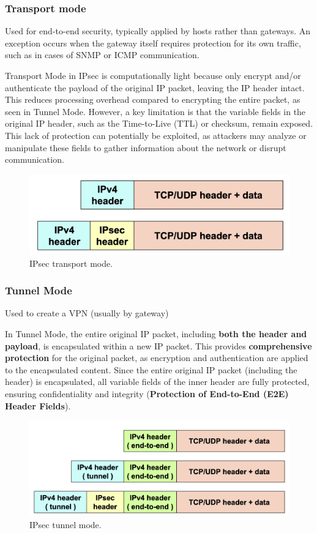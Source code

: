 \subsubsection{Transport mode}
Used for end-to-end security, typically applied by hosts rather than gateways. An exception occurs when the gateway itself requires protection for its own traffic, such as in cases of SNMP or ICMP communication.

Transport Mode in IPsec is computationally light because only encrypt and/or authenticate the payload of the original IP packet, leaving the IP header intact. This reduces processing overhead compared to encrypting the entire packet, as seen in Tunnel Mode. However, a key limitation is that the variable fields in the original IP header, such as the Time-to-Live (TTL) or checksum, remain exposed. This lack of protection can potentially be exploited, as attackers may analyze or manipulate these fields to gather information about the network or disrupt communication.

\begin{figure}[H]
    \includegraphics[width=\linewidth]{Images/NetSec/ipsec_transport_mode.png}
    \caption{IPsec transport mode.}
\end{figure}

\subsubsection{Tunnel Mode}
Used to create a VPN (usually by gateway)

In Tunnel Mode, the entire original IP packet, including \textbf{both the header and payload}, is encapsulated within a new IP packet. This provides \textbf{comprehensive protection} for the original packet, as encryption and authentication are applied to the encapsulated content. Since the entire original IP packet (including the header) is encapsulated, all variable fields of the inner header are fully protected, ensuring confidentiality and integrity (\textbf{Protection of End-to-End (E2E) Header Fields}).

\begin{figure}[H]
    \includegraphics[width=\linewidth]{Images/NetSec/ipsec_tunnel_mode.png}
    \caption{IPsec tunnel mode.}
\end{figure}

